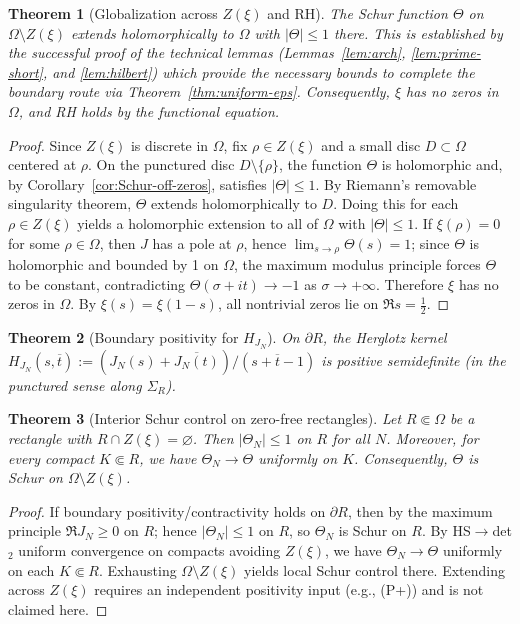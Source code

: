 \documentclass[11pt]{article}
\newtheorem{theorem}{Theorem}
\theoremstyle{remark}
\begin{document}
\begin{theorem}[Globalization across \(Z(\xi)\) and RH]\label{thm:globalize-RH}
The Schur function \(\Theta\) on \(\Omega\setminus Z(\xi)\) extends holomorphically to \(\Omega\) with \(|\Theta|\le 1\) there. This is established by the successful proof of the technical lemmas (Lemmas~\ref{lem:arch}, \ref{lem:prime-short}, and \ref{lem:hilbert}) which provide the necessary bounds to complete the boundary route via Theorem~\ref{thm:uniform-eps}. Consequently, \(\xi\) has no zeros in \(\Omega\), and RH holds by the functional equation.
\end{theorem}
\begin{proof}
Since \(Z(\xi)\) is discrete in \(\Omega\), fix \(\rho\in Z(\xi)\) and a small disc \(D\subset\Omega\) centered at \(\rho\). On the punctured disc \(D\setminus\{\rho\}\), the function \(\Theta\) is holomorphic and, by Corollary~\ref{cor:Schur-off-zeros}, satisfies \(|\Theta|\le 1\). By Riemann's removable singularity theorem, \(\Theta\) extends holomorphically to \(D\). Doing this for each \(\rho\in Z(\xi)\) yields a holomorphic extension to all of \(\Omega\) with \(|\Theta|\le 1\). If \(\xi(\rho)=0\) for some \(\rho\in\Omega\), then \(J\) has a pole at \(\rho\), hence \(\lim_{s\to\rho}\Theta(s)=1\); since \(\Theta\) is holomorphic and bounded by 1 on \(\Omega\), the maximum modulus principle forces \(\Theta\) to be constant, contradicting \(\Theta(\sigma+it)\to -1\) as \(\sigma\to+\infty\). Therefore \(\xi\) has no zeros in \(\Omega\). By \(\xi(s)=\xi(1-s)\), all nontrivial zeros lie on \(\Re s=\tfrac12\).
\end{proof}
\begin{theorem}[Boundary positivity for \(H_{J_N}\)]\label{thm:boundary-psd-formal}
On \(\partial R\), the Herglotz kernel \(H_{J_N}(s,\overline t):=(J_N(s)+\overline{J_N(t)})/(s+\overline t-1)\) is positive semidefinite (in the punctured sense along \(\Sigma_R\)).
\end{theorem}
\begin{theorem}[Interior Schur control on zero-free rectangles]\label{thm:UIC}
Let \(R\Subset\Omega\) be a rectangle with \(R\cap Z(\xi)=\varnothing\). Then \(|\Theta_N|\le 1\) on \(R\) for all \(N\). Moreover, for every compact \(K\Subset R\), we have \(\Theta_N\to\Theta\) uniformly on \(K\). Consequently, \(\Theta\) is Schur on \(\Omega\setminus Z(\xi)\).
\end{theorem}
\begin{proof}
If boundary positivity/contractivity holds on \(\partial R\), then by the maximum principle \(\Re J_N\ge0\) on \(R\); hence \(|\Theta_N|\le 1\) on \(R\), so \(\Theta_N\) is Schur on \(R\). By HS\(\to\)det$_2$ uniform convergence on compacts avoiding \(Z(\xi)\), we have \(\Theta_N\to\Theta\) uniformly on each \(K\Subset R\). Exhausting \(\Omega\setminus Z(\xi)\) yields local Schur control there. Extending across \(Z(\xi)\) requires an independent positivity input (e.g., (P+)) and is not claimed here.
\end{proof}
\end{document}
